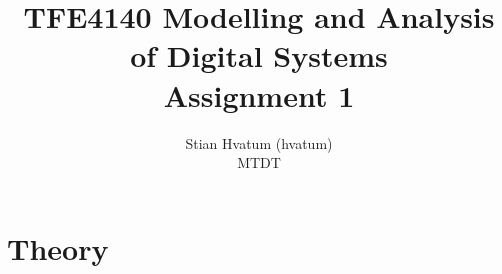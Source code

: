 \documentclass[english,a4paper]{report}
\title{TFE4140 Modelling and Analysis of Digital Systems\\
\Huge Assignment 1}
\author{Stian Hvatum (hvatum)\\MTDT}
\begin{document}
\maketitle
\tableofcontents
\newpage
\section{Theory}
\end{document}
